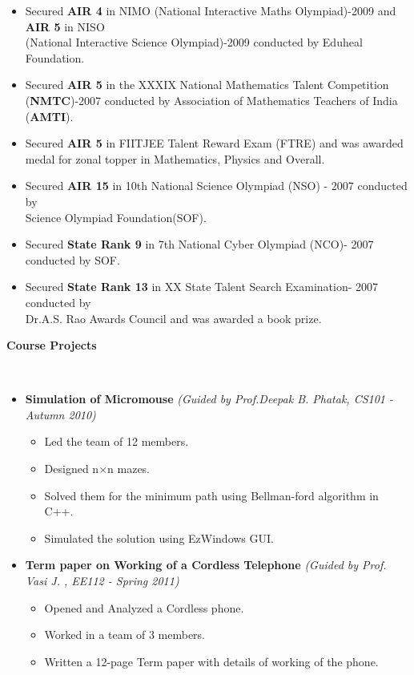 \documentclass[a4paper,11pt]{article}
\newcommand{\isep}{-2 pt}
\newcommand{\lsep}{-0.5cm}
\newcommand{\resheading}[1]{{\small \colorbox{mygrey}{\begin{minipage}{0.975\textwidth}{\textbf{#1 \vphantom{p\^{E}}}}\end{minipage}}}}
\begin{document}
\begin{itemize}
   \item Secured \textbf{AIR 4} in NIMO (National Interactive Maths Olympiad)-2009 and \textbf{AIR 5} in NISO\\ (National Interactive Science Olympiad)-2009 conducted by Eduheal Foundation.\\[-0.8cm]
  \item Secured \textbf{AIR 5} in the  XXXIX National Mathematics Talent Competition (\textbf{NMTC})-2007 conducted by Association of Mathematics Teachers of India (\textbf{AMTI}).\\[-0.8cm]
  \item Secured \textbf{AIR 5} in FIITJEE Talent Reward Exam (FTRE) and was awarded medal for zonal topper in Mathematics, Physics and Overall.
  \item Secured \textbf{AIR 15} in 10th National Science Olympiad (NSO) - 2007 conducted by \\ Science Olympiad Foundation(SOF).\\[-0.8cm]
  \item Secured \textbf{State Rank 9} in 7th National Cyber Olympiad (NCO)- 2007 conducted by SOF.\\[-0.8cm]
 \item Secured \textbf{State Rank 13} in XX State Talent Search Examination- 2007 conducted by \\ Dr.A.S. Rao Awards Council and was awarded a book prize.
\end{itemize}


\resheading{\textbf{\large Course Projects}}\\[\lsep]
\begin{itemize}
\item \textbf{Simulation of Micromouse} \emph{(Guided by Prof.Deepak B. Phatak, CS101 - Autumn 2010)}\\[-0.6cm]
	\begin{itemize}\itemsep \isep 
	    \item Led the team of 12 members.
	    \item Designed n$\times$n mazes.
	    \item Solved them for the minimum path using Bellman-ford algorithm in C++. 
	    \item Simulated the solution using EzWindows GUI.
	\end{itemize} 
\item \textbf{Term paper on Working of a Cordless Telephone} \emph{(Guided by Prof. Vasi J. , EE112 - Spring 2011)\\[-0.6cm]}
	\begin{itemize} \itemsep \isep
	  \item Opened and Analyzed a Cordless phone.
	  \item Worked in a team of 3 members.
	  \item Written a 12-page Term paper with details of working of the phone.
	\end{itemize}
\end{itemize}
\end{document}
